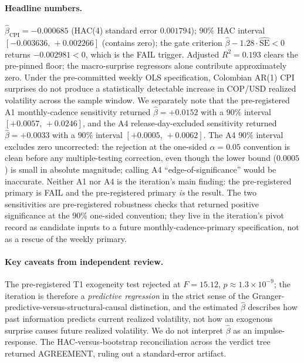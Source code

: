 \paragraph{Headline numbers.} \(\hat{\beta}_{\mathrm{CPI}} = -0.000685\)
(HAC(4) standard error \(0.001794\)); \(90\%\) HAC interval
\([-0.003636,\,+0.002266]\) (contains zero); the gate criterion
\(\hat{\beta} - 1.28 \cdot \widehat{\mathrm{SE}} < 0\) returns
\(-0.002981 < 0\), which is the FAIL trigger. Adjusted \(R^2 = 0.193\)
clears the pre-pinned floor; the macro-surprise regressors alone
contribute approximately zero. Under the pre-committed weekly OLS
specification, Colombian AR(1) CPI surprises do not produce a
statistically detectable increase in COP/USD realized volatility
across the sample window. We separately note that the pre-registered
A1 monthly-cadence sensitivity returned
\(\hat{\beta} = +0.0152\) with a \(90\%\) interval
\([+0.0057,\,+0.0246]\), and the A4 release-day-excluded sensitivity
returned \(\hat{\beta} = +0.0033\) with a \(90\%\) interval
\([+0.0005,\,+0.0062]\). The A4 \(90\%\) interval excludes zero
uncorrected: the rejection at the one-sided \(\alpha = 0.05\)
convention is clean before any multiple-testing correction, even
though the lower bound (\(0.0005\)) is small in absolute magnitude;
calling A4 ``edge-of-significance'' would be inaccurate. Neither A1
nor A4 is the iteration's main finding: the pre-registered primary is
FAIL and the pre-registered primary \emph{is} the result. The two
sensitivities are pre-registered robustness checks that returned
positive significance at the \(90\%\) one-sided convention; they live
in the iteration's pivot record as candidate inputs to a future
monthly-cadence-primary specification, not as a rescue of the
weekly primary.

\paragraph{Key caveats from independent review.} The pre-registered
T1 exogeneity test rejected at \(F = 15.12\),
\(p \approx 1.3 \times 10^{-9}\); the iteration is therefore a
\emph{predictive regression} in the strict sense of the
Granger-predictive-versus-structural-causal distinction, and the
estimated \(\hat{\beta}\) describes how past information predicts
current realized volatility, not how an exogenous surprise causes
future realized volatility. We do not interpret \(\hat{\beta}\) as an
impulse-response. The HAC-versus-bootstrap reconciliation across the
verdict tree returned AGREEMENT, ruling out a standard-error artifact.

